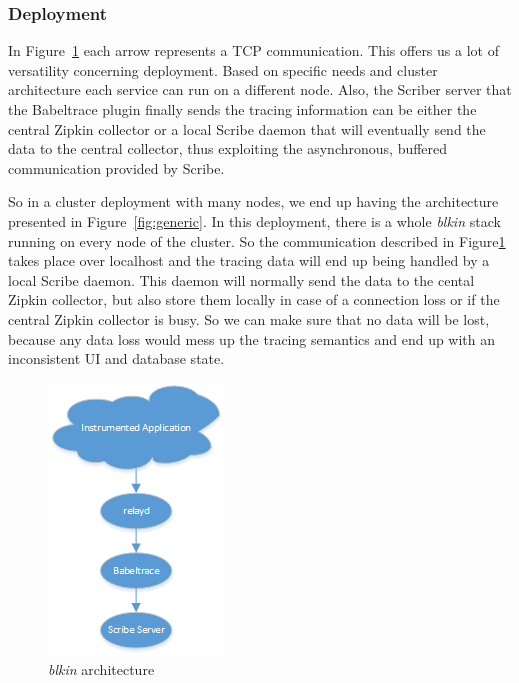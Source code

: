 \documentclass[a4paper,10pt,twocolumn]{article}
\begin{document}
\subsubsection{Deployment} In Figure~\ref{fig:specific} each arrow represents a
TCP communication. This offers us a lot of versatility concerning deployment.
Based on specific needs and cluster architecture each service can run on a
different node.  Also, the Scriber server that the Babeltrace plugin finally
sends the tracing information can be either the central Zipkin collector or a
local Scribe daemon that will eventually send the data to the central collector,
thus exploiting the asynchronous, buffered communication provided by Scribe.

So in a cluster deployment with many nodes, we end up having the architecture
presented in Figure~\ref{fig:generic}. In this deployment, there is a whole
\emph{blkin} stack running on every node of the cluster. So the communication
described in Figure\ref{fig:specific} takes place over localhost and the tracing
data will end up being handled by a local Scribe daemon. This daemon will
normally send the data to the cental Zipkin collector, but also store them
locally in case of a connection loss or if the central Zipkin collector is busy.
So we can make sure that no data will be lost, because any data loss would mess
up the tracing semantics and end up with an inconsistent UI and database state.

\begin{figure}[h!]
  \centering
  \includegraphics[scale=0.75]{images/specific.png}
  \caption{\emph{blkin} architecture}
  \label{fig:specific}
\end{figure}
\end{document}
